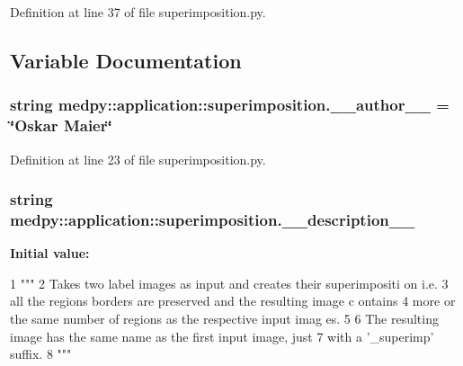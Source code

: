 Definition at line 37 of file superimposition.py.



\subsection{Variable Documentation}
\hypertarget{namespacemedpy_1_1application_1_1superimposition_a18a2daaf57afc7defd35222f30430a3a}{
\subsubsection[{\_\-\_\-author\_\-\_\-}]{\setlength{\rightskip}{0pt plus 5cm}string {\bf medpy::application::superimposition.\_\-\_\-author\_\-\_\-} = \char`\"{}Oskar Maier\char`\"{}}}
\label{namespacemedpy_1_1application_1_1superimposition_a18a2daaf57afc7defd35222f30430a3a}


Definition at line 23 of file superimposition.py.

\hypertarget{namespacemedpy_1_1application_1_1superimposition_ab45ada1106f654c856f65ae14bcb4a6e}{
\subsubsection[{\_\-\_\-description\_\-\_\-}]{\setlength{\rightskip}{0pt plus 5cm}string {\bf medpy::application::superimposition.\_\-\_\-description\_\-\_\-}}}
\label{namespacemedpy_1_1application_1_1superimposition_ab45ada1106f654c856f65ae14bcb4a6e}
{\bfseries Initial value:}
\begin{DoxyCode}
1 """
2                   Takes two label images as input and creates their superimpositi
      on i.e.
3                   all the regions borders are preserved and the resulting image c
      ontains
4                   more or the same number of regions as the respective input imag
      es.
5                   
6                   The resulting image has the same name as the first input image,
       just
7                   with a '_superimp' suffix.
8                   """
\end{DoxyCode}


